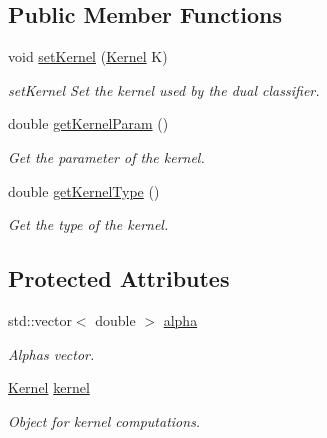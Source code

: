 \subsection*{Public Member Functions}
\begin{DoxyCompactItemize}
\item 
void \hyperlink{class_dual_classifier_a0cf616ad02cfcdd69cfd3d0b35001946}{set\+Kernel} (\hyperlink{class_kernel}{Kernel} K)
\begin{DoxyCompactList}\small\item\em set\+Kernel Set the kernel used by the dual classifier. \end{DoxyCompactList}\item 
double \hyperlink{class_dual_classifier_a5738038f99450f5f3b7098d3125ffaae}{get\+Kernel\+Param} ()
\begin{DoxyCompactList}\small\item\em Get the parameter of the kernel. \end{DoxyCompactList}\item 
double \hyperlink{class_dual_classifier_a14b35e85dddac38e7927cd03037e2353}{get\+Kernel\+Type} ()
\begin{DoxyCompactList}\small\item\em Get the type of the kernel. \end{DoxyCompactList}\end{DoxyCompactItemize}
\subsection*{Protected Attributes}
\begin{DoxyCompactItemize}
\item 
\mbox{\label{class_dual_classifier_a0ed1219ed410852620b844934a8c70a0}} 
std\+::vector$<$ double $>$ \hyperlink{class_dual_classifier_a0ed1219ed410852620b844934a8c70a0}{alpha}
\begin{DoxyCompactList}\small\item\em Alphas vector. \end{DoxyCompactList}\item 
\mbox{\label{class_dual_classifier_a710addb26d481a0b7b60e37e537c2290}} 
\hyperlink{class_kernel}{Kernel} \hyperlink{class_dual_classifier_a710addb26d481a0b7b60e37e537c2290}{kernel}
\begin{DoxyCompactList}\small\item\em Object for kernel computations. \end{DoxyCompactList}\end{DoxyCompactItemize}


